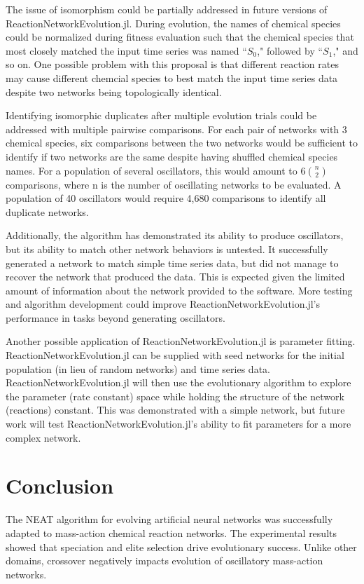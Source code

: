\documentclass[12pt]{report}
\begin{document}
The issue of isomorphism could be partially addressed in future versions of ReactionNetworkEvolution.jl. During evolution, the names of chemical species could be normalized during fitness evaluation such that the chemical species that most closely matched the input time series was named ``$S_0$," followed by ``$S_1$," and so on. One possible problem with this proposal is that different reaction rates may cause different chemcial species to best match the input time series data despite two networks being topologically identical. 

Identifying isomorphic duplicates after multiple evolution trials could be addressed with multiple pairwise comparisons. For each pair of networks with 3 chemical species, six comparisons between the two networks would be sufficient to identify if two networks are the same despite having shuffled chemical species names. For a population of several oscillators, this would amount to 6${n\choose 2}$ comparisons, where n is the number of oscillating networks to be evaluated. A population of 40 oscillators would require 4,680 comparisons to identify all duplicate networks.

Additionally, the algorithm has demonstrated its ability to produce oscillators, but its ability to match other network behaviors is untested. It successfully generated a network to match simple time series data, but did not manage to recover the network that produced the data. This is expected given the limited amount of information about the network provided to the software. More testing and algorithm development could improve ReactionNetworkEvolution.jl's performance in tasks beyond generating oscillators. 

Another possible application of ReactionNetworkEvolution.jl is parameter fitting. ReactionNetworkEvolution.jl can be supplied with seed networks for the initial population (in lieu of random networks) and time series data. ReactionNetworkEvolution.jl will then use the evolutionary algorithm to explore the parameter (rate constant) space while holding the structure of the network (reactions) constant. This was demonstrated with a simple network, but future work will test ReactionNetworkEvolution.jl's ability to fit parameters for a more complex network. 

\section{Conclusion}
The NEAT algorithm for evolving artificial neural networks was successfully adapted to mass-action chemical reaction networks. The experimental results showed that speciation and elite selection drive evolutionary success. Unlike other domains, crossover negatively impacts evolution of oscillatory mass-action networks. 
\end{document}
